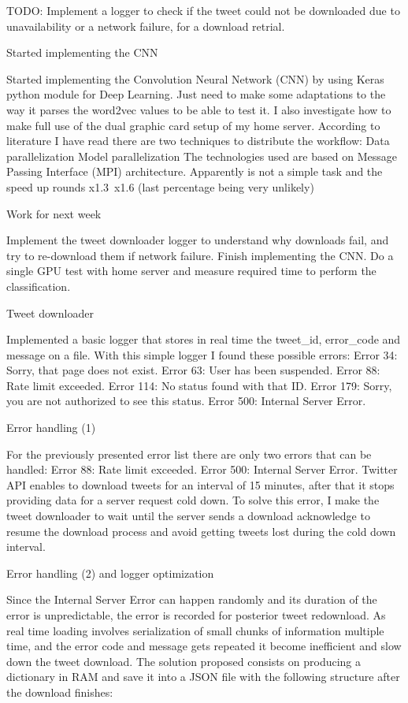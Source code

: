 TODO: Implement a logger to check if the tweet could not be downloaded due to unavailability or a network failure, for a download retrial.

Started implementing the CNN

Started implementing the Convolution Neural Network (CNN) by using Keras\cite{keras} python module for Deep Learning.
Just need to make some adaptations to the way it parses the word2vec values to be able to test it.
I also investigate how to make full use of the dual graphic card setup of my home server. According to literature I have read there are two techniques to distribute the workflow:
Data parallelization
Model parallelization
The technologies used are based on Message Passing Interface (MPI) architecture. Apparently is not a simple task and the speed up rounds x1.3~x1.6 (last percentage being very unlikely)

Work for next week

Implement the tweet downloader logger to understand why downloads fail, and try to re-download them if network failure.
Finish implementing the CNN.
Do a single GPU test with home server and measure required time to perform the classification.

Tweet downloader

Implemented a basic logger that stores in real time the tweet\_id, error\_code and message on a file. With this simple logger I found these possible errors:
Error 34: Sorry, that page does not exist.
Error 63: User has been suspended.
Error 88: Rate limit exceeded.
Error 114: No status found with that ID.
Error 179: Sorry, you are not authorized to see this status.
Error 500: Internal Server Error.

Error handling (1)

For the previously presented error list there are only two errors that can be handled:
Error 88: Rate limit exceeded.
Error 500: Internal Server Error.
Twitter API enables to download tweets for an interval of 15 minutes, after that it stops providing data for a server request cold down. To solve this error, I make the tweet downloader to wait until the server sends a download acknowledge to resume the download process and avoid getting tweets lost during the cold down interval.

Error handling (2) and logger optimization

Since the Internal Server Error can happen randomly and its duration of the error is unpredictable, the error is recorded for posterior tweet redownload.
As real time loading involves serialization of small chunks of information multiple time, and the error code and message gets repeated it become inefficient and slow down the tweet download. The solution proposed consists on producing a dictionary in RAM and save it into a JSON file with the following structure after the download finishes:

